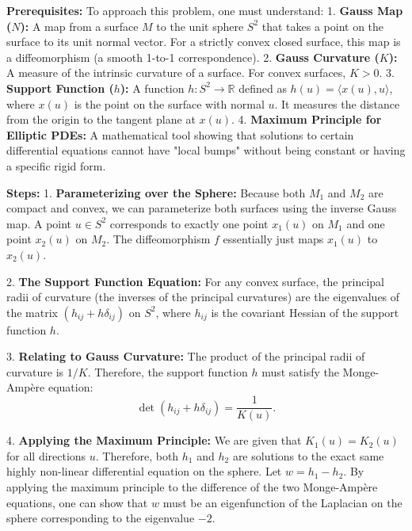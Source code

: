 \begin{solution}
\textbf{Prerequisites:}
To approach this problem, one must understand:
1. \textbf{Gauss Map ($N$):} A map from a surface $M$ to the unit sphere $S^2$ that takes a point on the surface to its unit normal vector. For a strictly convex closed surface, this map is a diffeomorphism (a smooth 1-to-1 correspondence).
2. \textbf{Gauss Curvature ($K$):} A measure of the intrinsic curvature of a surface. For convex surfaces, $K > 0$.
3. \textbf{Support Function ($h$):} A function $h: S^2 \to \mathbb{R}$ defined as $h(u) = \langle x(u), u \rangle$, where $x(u)$ is the point on the surface with normal $u$. It measures the distance from the origin to the tangent plane at $x(u)$.
4. \textbf{Maximum Principle for Elliptic PDEs:} A mathematical tool showing that solutions to certain differential equations cannot have "local bumps" without being constant or having a specific rigid form.
\par\vspace{\baselineskip}

\textbf{Steps:}
1. \textbf{Parameterizing over the Sphere:}
Because both $M_1$ and $M_2$ are compact and convex, we can parameterize both surfaces using the inverse Gauss map. A point $u \in S^2$ corresponds to exactly one point $x_1(u)$ on $M_1$ and one point $x_2(u)$ on $M_2$. The diffeomorphism $f$ essentially just maps $x_1(u)$ to $x_2(u)$.
\par\vspace{\baselineskip}

2. \textbf{The Support Function Equation:}
For any convex surface, the principal radii of curvature (the inverses of the principal curvatures) are the eigenvalues of the matrix $(h_{ij} + h \delta_{ij})$ on $S^2$, where $h_{ij}$ is the covariant Hessian of the support function $h$.
\par\vspace{\baselineskip}

3. \textbf{Relating to Gauss Curvature:}
The product of the principal radii of curvature is $1/K$. Therefore, the support function $h$ must satisfy the Monge-Ampère equation:
\[ \det(h_{ij} + h \delta_{ij}) = \frac{1}{K(u)}. \]
\par\vspace{\baselineskip}

4. \textbf{Applying the Maximum Principle:}
We are given that $K_1(u) = K_2(u)$ for all directions $u$. Therefore, both $h_1$ and $h_2$ are solutions to the exact same highly non-linear differential equation on the sphere. Let $w = h_1 - h_2$. By applying the maximum principle to the difference of the two Monge-Ampère equations, one can show that $w$ must be an eigenfunction of the Laplacian on the sphere corresponding to the eigenvalue $-2$.
\par\vspace{\baselineskip}


\end{solution}
